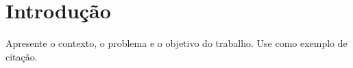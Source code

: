 \section{Introdução}

Apresente o contexto, o problema e o objetivo do trabalho.
Use \cite{knuth:84} como exemplo de citação.
